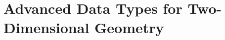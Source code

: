 \chapter{Advanced Data Types for Two-Dimensional Geometry} 
\label{Advanced Data Types for Two-Dimensional Geometry}


\newpage

\newpage

\newpage

\newpage

\newpage

